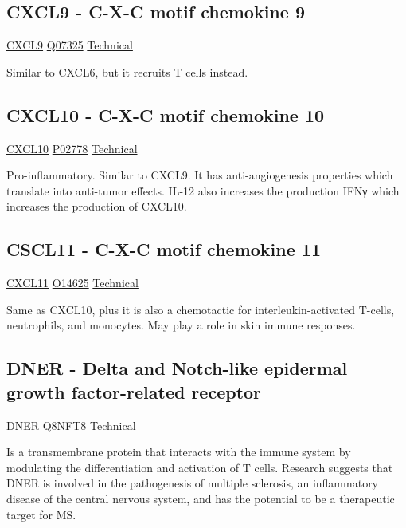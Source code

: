 \subsection{CXCL9 - C-X-C motif chemokine 9}

\href{https://en.wikipedia.org/wiki/CXCL9}{CXCL9}
\href{http://www.uniprot.org/uniprot/Q07325}{Q07325}
\href{https://olink.com/products-services/target/protein/?assayID=5081}{Technical}

Similar to CXCL6, but it recruits T cells instead.

\subsection{CXCL10 - C-X-C motif chemokine 10}

\href{https://en.wikipedia.org/wiki/CXCL10}{CXCL10}
\href{http://www.uniprot.org/uniprot/P02778}{P02778}
\href{https://olink.com/products-services/target/protein/?assayID=5093}{Technical}

Pro-inflammatory. Similar to CXCL9. It has anti-angiogenesis properties which translate into anti-tumor effects. IL-12 also increases the production IFNγ which increases the production of CXCL10.

\subsection{CSCL11 - C-X-C motif chemokine 11}

\href{https://en.wikipedia.org/wiki/CXCL11}{CXCL11}
\href{http://www.uniprot.org/uniprot/O14625}{O14625}
\href{https://olink.com/products-services/target/protein/?assayID=5077}{Technical}

Same as CXCL10, plus it is also a chemotactic for interleukin-activated T-cells, neutrophils, and monocytes. May play a role in skin immune responses.

\subsection{DNER - Delta and Notch-like epidermal growth factor-related receptor}

\href{https://en.wikipedia.org/wiki/DNER}{DNER}
\href{http://www.uniprot.org/uniprot/Q8NFT8}{Q8NFT8}
\href{https://olink.com/products-services/target/protein/?assayID=5088}{Technical}

Is a transmembrane protein that interacts with the immune system by modulating the differentiation and activation of T cells. Research suggests that DNER is involved in the pathogenesis of multiple sclerosis, an inflammatory disease of the central nervous system, and has the potential to be a therapeutic target for MS.

